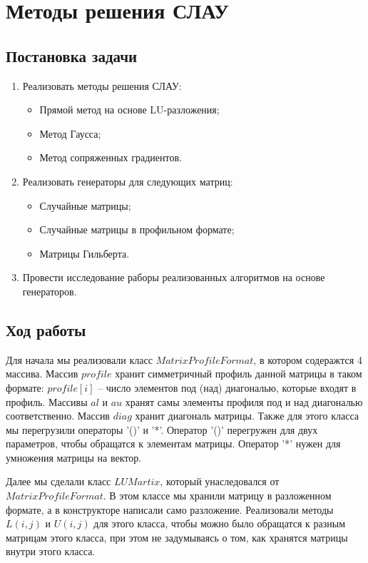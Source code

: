 \chapter{Методы решения СЛАУ}

\section{Постановка задачи}

\begin{enumerate}
    \item Реализовать методы решения СЛАУ:
    \begin{itemize}
        \item Прямой метод на основе LU-разложения;
        \item Метод Гаусса;
        \item Метод сопряженных градиентов.
    \end{itemize}
    \item Реализовать генераторы для следующих матриц:
    \begin{itemize}
        \item Случайные матрицы;
        \item Случайные матрицы в профильном формате;
        \item Матрицы Гильберта.
    \end{itemize}
    \item Провести исследование раборы реализованных алгоритмов на основе генераторов.
\end{enumerate}

\section{Ход работы}

Для начала мы реализовали класс $MatrixProfileFormat$, в котором содеражтся 4 массива.
Массив $profile$ хранит симметричный профиль данной матрицы в таком формате: $profile[i]$ -- 
число элементов под (над) диагональю, которые входят в профиль. Массивы $al$ и $au$
хранят самы элементы профиля под и над диагональю соответственно. Массив $diag$ 
хранит диагональ матрицы. Также для этого класса мы перегрузили операторы '()' и '*'.
Оператор '()' перегружен для двух параметров, чтобы обращатся к элементам матрицы.
Оператор '*' нужен для умножения матрицы на вектор.

Далее мы сделали класс $LUMartix$, который унаследовался от $MatrixProfileFormat$.
В этом классе мы хранили матрицу в разложенном формате, а в конструкторе написали
само разложение. Реализовали методы $L(i, j)$ и $U(i, j)$ для этого класса, чтобы можно было 
обращатся к разным матрицам этого класса, при этом не задумываясь о том, как хранятся матрицы
внутри этого класса.

